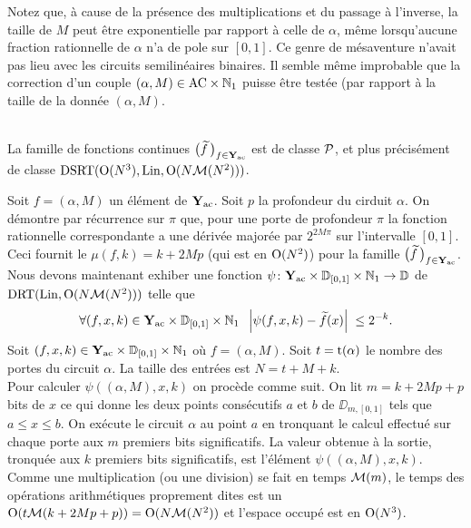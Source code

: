 Notez que, à cause de la présence des multiplications et du passage à 
l'inverse, la taille de  $M$ peut être exponentielle par rapport à celle de  
$\alpha$, même lorsqu'aucune fraction rationnelle de $\alpha$ n'a de pole sur  
$[0,1]$.  Ce genre de mésaventure n'avait pas lieu avec les circuits 
semilinéaires binaires.
Il semble même improbable que la correction d'un couple 
$(\alpha, M) \in {\rm AC} \times \mathbb {N}_1$  puisse être testée \etpo (par rapport 
à la taille de la donnée $(\alpha, M)$. 

\begin{fproposition} \label{f4111}~\\    
La famille de fonctions continues  $\big(\widetilde{f}\,\big)_{f \in {{\bf Y}_{\rm ac}} }$  est \uni de 
classe  ${\cal P}$, et plus précisément de classe  ${\rm DSRT}({\rm O}(N^3), {\rm Lin}, 
{\rm O}(N{{{\cal M}}}(N^2)))$.
\end{fproposition}

\proof 	Soit $ f = (\alpha,M) $ un élément de  ${{\bf Y}_{\rm ac}}$. Soit $ p $ la 
profondeur du cirduit $\alpha$. On démontre par récurrence sur $\pi$ que, pour 
une porte de profondeur $\pi$  la fonction 
rationnelle correspondante a une dérivée majorée par $2^{2M \pi}$ sur 
l'intervalle $[0,1]$. Ceci fournit le \mcu  $\mu(f,k) = k + 2Mp$  (qui est en 
${\rm O}(N^2)$) pour la famille  $\big(\widetilde{f}\,\big)_{f \in {{\bf Y}_{\rm ac}} }$. \\
Nous devons maintenant exhiber une fonction  
$\psi \colon  {{\bf Y}_{\rm ac}}  \times \mathbb {D}_{[0,1]} \times \mathbb {N}_1 \rightarrow \mathbb {D}$  
de \com $ {\rm DRT}({\rm Lin},{\rm O}(N{{\cal M}}(N^2))) $ telle que
\[
\forall (f, x, k) \in {{\bf Y}_{\rm ac}}  \times \mathbb {D}_{[0,1]} \times \mathbb {N}_1 \; \;
\left|{ \psi(f,x,k) - \widetilde{f}(x)}\right| \;  \leq 2^{-k}.
\]
Soit  $(f, x, k) \in {{\bf Y}_{\rm ac}}  \times \mathbb {D}_{[0,1]} \times \mathbb {N}_1$  où  
$f = (\alpha,M)$.  Soit $ t = {\rm t}(\alpha) $ le nombre des portes du circuit 
$\alpha$. La taille des entrées est $N = t+M+k$. \\ 
Pour calculer $\psi((\alpha,M), x, k)$  on procède comme suit.  
On lit $ m = k+2Mp+p $ bits de $x$ ce qui donne les deux points consécutifs
 $ a $ et $ b $ de $\DD_{m,[0,1]}$   tels que $a \leq x \leq b$.  On exécute 
le circuit $ \alpha $ au point $ a $ en tronquant le calcul effectué sur 
chaque porte aux $ m $ premiers bits significatifs. La valeur obtenue à la 
sortie, tronquée aux $ k $ premiers bits significatifs, est l'élément 
$\psi((\alpha,M), x, k)$. Comme une multiplication (ou une division) se fait en 
temps ${{{\cal M}}}(m)$, le temps des opérations arithmétiques proprement dites est 
un ${\rm O}(t {{\cal M}}(k+2Mp+p)) = {\rm O}(N{{\cal M}}(N^2))$ et l'espace occupé est en ${\rm O}(N^3)$.
	\eop 

